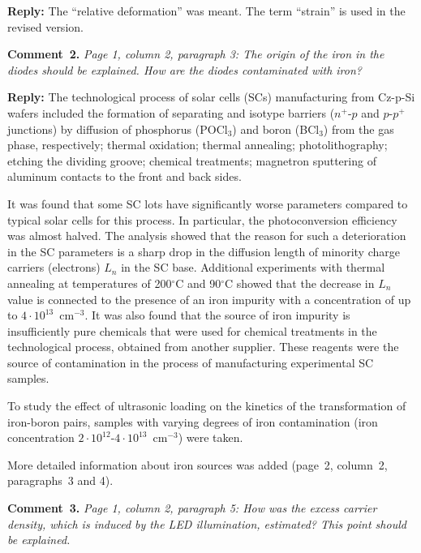 \documentclass[aip,jap,preprint]{revtex4-1}
\begin{document}
\noindent
\textcolor[rgb]{0.51,0.00,0.00}{\textbf{Reply:}}
The ``relative deformation'' was meant.
The term ``strain'' is used in the revised version.


\vspace{1cm}
\noindent
\textcolor[rgb]{0.00,0.50,1.00}{\textbf{Comment~2.}}
\emph{Page 1, column 2, paragraph 3: The origin of the iron in the diodes should be explained. How are the diodes contaminated with iron? }

\noindent
\textcolor[rgb]{0.51,0.00,0.00}{\textbf{Reply:}}
The technological process of solar cells (SCs) manufacturing from Cz-p-Si wafers included the formation of separating and isotype barriers ($n^+$-$p$ and $p$-$p^+$ junctions) by diffusion of phosphorus (POCl$_3$) and boron (BCl$_3$) from the gas phase, respectively; thermal oxidation; thermal annealing; photolithography; etching the dividing groove; chemical treatments; magnetron sputtering of aluminum contacts to the front and back sides.

It was found that some SC lots have significantly worse parameters compared to typical solar cells for this process.
In particular, the photoconversion efficiency was almost halved.
The analysis showed that the reason for such a deterioration in the SC parameters is a sharp drop in the diffusion length of minority charge carriers (electrons) $L_n$ in the SC base.
Additional experiments with thermal annealing at temperatures of 200$^\circ$C and 90$^\circ$C showed that the decrease in $L_n$ value is connected to the presence of an iron impurity with a concentration of up to $4\cdot10^{13}$~cm$^{-3}$.
It was also found that the source of iron impurity is insufficiently pure chemicals that were used for chemical treatments in the technological process, obtained from another supplier.
These reagents were the source of contamination in the process of manufacturing experimental SC samples.

To study the effect of ultrasonic loading on the kinetics of the transformation  of iron-boron pairs, samples with varying degrees of iron contamination (iron concentration $2\cdot10^{12}$-$4\cdot10^{13}$~cm$^{-3}$) were taken.

More detailed information about iron sources was added (page~2, column~2, paragraphs~3 and 4).


\vspace{1cm}
\noindent
\textcolor[rgb]{0.00,0.50,1.00}{\textbf{Comment~3.}}
\emph{Page 1, column 2, paragraph 5: How was the excess carrier density, which is induced by the LED illumination, estimated? This point should be explained. }
\end{document}
